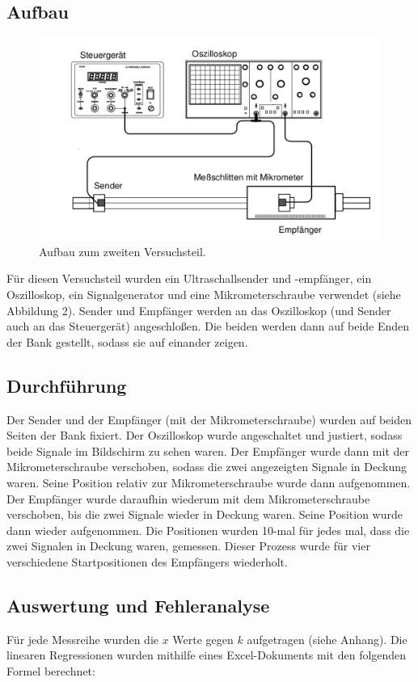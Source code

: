 \documentclass[11pt,a4paper]{article}
\begin{document}
\subsection{Aufbau}
\begin{figure}
	\centering
	\includegraphics[scale=0.5]{Abb2}
	\caption{Aufbau zum zweiten Versuchsteil. \cite{Anleitung}}
\end{figure}

Für diesen Versuchsteil wurden ein Ultraschallsender und -empfänger, ein Oszilloskop, ein Signalgenerator und eine Mikrometerschraube verwendet (siehe Abbildung 2). Sender und Empf\"anger werden an das Oszilloskop (und Sender auch an das Steuerger\"at) angeschlo\ss en. Die beiden werden dann auf beide Enden der Bank gestellt, sodass sie auf einander zeigen.

\subsection{Durchführung}
Der Sender und der Empfänger (mit der Mikrometerschraube) wurden auf beiden Seiten der Bank fixiert. Der Oszilloskop wurde angeschaltet und justiert, sodass beide Signale im Bildschirm zu sehen waren. Der Empfänger wurde dann mit der Mikrometerschraube verschoben, sodass die zwei angezeigten Signale in Deckung waren. Seine Position relativ zur Mikrometerschraube wurde dann aufgenommen. Der Empfänger wurde daraufhin wiederum mit dem Mikrometerschraube verschoben, bis die zwei Signale wieder in Deckung waren. Seine Position wurde dann wieder aufgenommen. Die Positionen wurden 10-mal für jedes mal, dass die zwei Signalen in Deckung waren, gemessen. Dieser Prozess wurde für vier verschiedene Startpositionen des Empfängers wiederholt. 



\subsection{Auswertung und Fehleranalyse}
Für jede Messreihe wurden die $x$ Werte gegen $k$ aufgetragen (siehe Anhang). Die linearen Regressionen wurden mithilfe eines Excel-Dokuments mit den folgenden Formel berechnet: 
\end{document}

